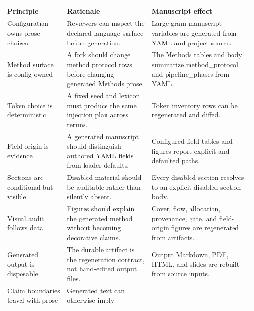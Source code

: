 \documentclass[
  english,
]{article}
\newcounter{none} %
\begin{document}
{\def\LTcaptype{none} %
\begin{longtable}[]{@{}
  >{\raggedright\arraybackslash}p{}
  >{\raggedright\arraybackslash}p{}
  >{\raggedright\arraybackslash}p{}@{}}
\toprule\noalign{}
\begin{minipage}[b]{\linewidth}\raggedright
Principle
\end{minipage} & \begin{minipage}[b]{\linewidth}\raggedright
Rationale
\end{minipage} & \begin{minipage}[b]{\linewidth}\raggedright
Manuscript effect
\end{minipage} \\
\midrule\noalign{}
\endhead
\bottomrule\noalign{}
\endlastfoot
Configuration owns prose choices & Reviewers can inspect the declared
language surface before generation. & Large-grain manuscript variables
are generated from YAML and project source. \\
Method surface is config-owned & A fork should change method protocol
rows before changing generated Methods prose. & The Methods tables and
body summarize method\_protocol and pipeline\_phases from YAML. \\
Token choice is deterministic & A fixed seed and lexicon must produce
the same injection plan across reruns. & Token inventory rows can be
regenerated and diffed. \\
Field origin is evidence & A generated manuscript should distinguish
authored YAML fields from loader defaults. & Configured-field tables and
figures report explicit and defaulted paths. \\
Sections are conditional but visible & Disabled material should be
auditable rather than silently absent. & Every disabled section resolves
to an explicit disabled-section body. \\
Visual audit follows data & Figures should explain the generated method
without becoming decorative claims. & Cover, flow, allocation,
provenance, gate, and field-origin figures are regenerated from
artifacts. \\
Generated output is disposable & The durable artifact is the
regeneration contract, not hand-edited output files. & Output Markdown,
PDF, HTML, and slides are rebuilt from source inputs. \\
Claim boundaries travel with prose & Generated text can otherwise imply

\end{longtable}}
\end{document}
